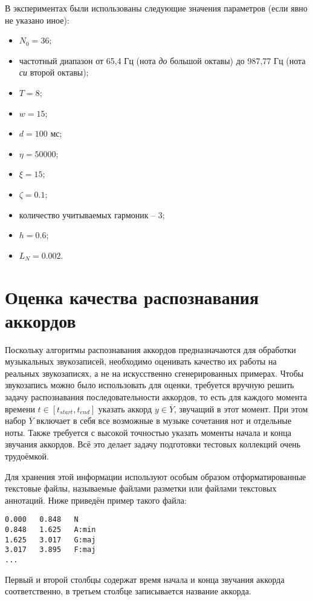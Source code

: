 В экспериментах были использованы следующие значения параметров (если явно не
указано иное):
\begin{itemize}
  \item $N_0 = 36$;
  \item частотный диапазон от 65,4 Гц (нота \emph{до} большой октавы) до 987,77
  Гц (нота \emph{си} второй октавы);
  \item $T = 8$;
  \item $w = 15$;
  \item $d = 100$ мс;
  \item $\eta = 50000$;
  \item $\xi = 15$;
  \item $\zeta = 0.1$;
  \item количество учитываемых гармоник -- 3;
  \item $h = 0.6$;
  \item $L_N = 0.002$.
\end{itemize}

\section{Оценка качества распознавания аккордов} \label{sect3_eval}

Поскольку алгоритмы распознавания аккордов предназначаются для обработки
музыкальных звукозаписей, необходимо оценивать качество их работы на реальных
звукозаписях, а не на искусственно сгенерированных примерах. Чтобы звукозапись
можно было использовать для оценки, требуется вручную решить задачу
распознавания последовательности аккордов, то есть для каждого момента времени
$t \in [t_{start}, t_{end}]$ указать аккорд $y \in \overline{Y}$, звучащий в
этот момент. При этом набор $\overline{Y}$ включает в себя все возможные в
музыке сочетания нот и отдельные ноты. Также требуется с высокой точностью
указать моменты начала и конца звучания аккордов. Всё это делает задачу
подготовки тестовых коллекций очень трудоёмкой.

Для хранения этой информации используют особым образом отформатированные
текстовые файлы, называемые файлами разметки или файлами текстовых аннотаций.
Ниже приведён пример такого файла:
\begin{lstlisting}
0.000	0.848	N
0.848	1.625	A:min
1.625	3.017	G:maj
3.017	3.895	F:maj
...
\end{lstlisting}
Первый и второй столбцы содержат время начала и конца звучания аккорда
соответственно, в третьем столбце записывается название аккорда. 

